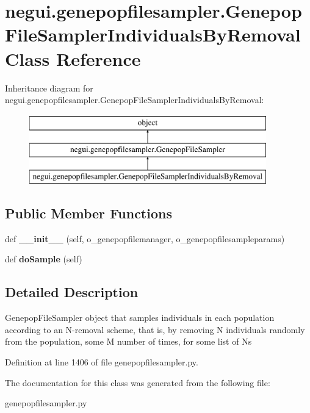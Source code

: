 \hypertarget{classnegui_1_1genepopfilesampler_1_1GenepopFileSamplerIndividualsByRemoval}{}\section{negui.\+genepopfilesampler.\+Genepop\+File\+Sampler\+Individuals\+By\+Removal Class Reference}
\label{classnegui_1_1genepopfilesampler_1_1GenepopFileSamplerIndividualsByRemoval}
Inheritance diagram for negui.\+genepopfilesampler.\+Genepop\+File\+Sampler\+Individuals\+By\+Removal\+:\begin{figure}[H]
\begin{center}
\leavevmode
\includegraphics[height=3.000000cm]{classnegui_1_1genepopfilesampler_1_1GenepopFileSamplerIndividualsByRemoval}
\end{center}
\end{figure}
\subsection*{Public Member Functions}
\begin{DoxyCompactItemize}
\item 
def {\bfseries \+\_\+\+\_\+init\+\_\+\+\_\+} (self, o\+\_\+genepopfilemanager, o\+\_\+genepopfilesampleparams)\hypertarget{classnegui_1_1genepopfilesampler_1_1GenepopFileSamplerIndividualsByRemoval_aeba1258d811dd266cb3378212a4a1926}{}\label{classnegui_1_1genepopfilesampler_1_1GenepopFileSamplerIndividualsByRemoval_aeba1258d811dd266cb3378212a4a1926}

\item 
def {\bfseries do\+Sample} (self)\hypertarget{classnegui_1_1genepopfilesampler_1_1GenepopFileSamplerIndividualsByRemoval_a89dd3d276b9f089ac4c46dd844e7a848}{}\label{classnegui_1_1genepopfilesampler_1_1GenepopFileSamplerIndividualsByRemoval_a89dd3d276b9f089ac4c46dd844e7a848}

\end{DoxyCompactItemize}


\subsection{Detailed Description}
\begin{DoxyVerb}GenepopFileSampler object that samples individuals in each population
according to an N-removal scheme, that is, by removing N individuals 
randomly from the population, some M number of times, for some list of Ns
\end{DoxyVerb}
 

Definition at line 1406 of file genepopfilesampler.\+py.



The documentation for this class was generated from the following file\+:\begin{DoxyCompactItemize}
\item 
genepopfilesampler.\+py\end{DoxyCompactItemize}
